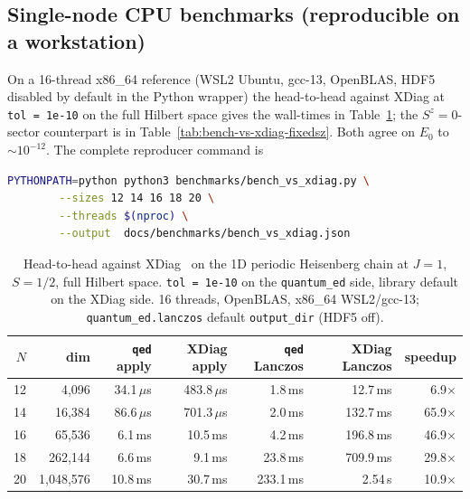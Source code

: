 \documentclass[submission, PhysCodeb]{SciPost}
\begin{document}
\subsection{Single-node CPU benchmarks (reproducible on a workstation)}
\label{sec:val-cpu}
On a 16-thread x86\_64 reference (WSL2 Ubuntu, gcc-13, OpenBLAS,
HDF5 disabled by default in the Python wrapper) the head-to-head
against XDiag at \texttt{tol = 1e-10} on the full Hilbert space gives
the wall-times in Table~\ref{tab:bench-vs-xdiag}; the
$S^z=0$-sector counterpart is in
Table~\ref{tab:bench-vs-xdiag-fixedsz}. Both agree on $E_0$ to
$\sim 10^{-12}$. The complete reproducer command is
\begin{lstlisting}[language=bash]
PYTHONPATH=python python3 benchmarks/bench_vs_xdiag.py \
        --sizes 12 14 16 18 20 \
        --threads $(nproc) \
        --output  docs/benchmarks/bench_vs_xdiag.json
\end{lstlisting}

\begin{table}[t]
\centering
\caption{Head-to-head against XDiag~\cite{Wietek2025XDiag} on the 1D
periodic Heisenberg chain at $J=1$, $S=1/2$, full Hilbert space.
\texttt{tol = 1e-10} on the \texttt{quantum\_ed} side, library
default on the XDiag side. 16 threads, OpenBLAS, x86\_64 WSL2/gcc-13;
\texttt{quantum\_ed.lanczos} default \texttt{output\_dir} (HDF5 off).}
\label{tab:bench-vs-xdiag}
\small
\begin{tabular}{rrrrrrr}
\toprule
$N$ & dim       & \texttt{qed} apply & XDiag apply &
\texttt{qed} Lanczos & XDiag Lanczos & speedup \\
\midrule
12  & 4{,}096   & 34.1\,$\mu$s & 483.8\,$\mu$s & 1.8\,ms  & 12.7\,ms  & 6.9$\times$  \\
14  & 16{,}384  & 86.6\,$\mu$s & 701.3\,$\mu$s & 2.0\,ms  & 132.7\,ms & 65.9$\times$ \\
16  & 65{,}536  & 6.1\,ms      & 10.5\,ms      & 4.2\,ms  & 196.8\,ms & 46.9$\times$ \\
18  & 262{,}144 & 6.6\,ms      & 9.1\,ms       & 23.8\,ms & 709.9\,ms & 29.8$\times$ \\
20  & 1{,}048{,}576 & 10.8\,ms & 30.7\,ms      & 233.1\,ms & 2.54\,s   & 10.9$\times$ \\
\bottomrule
\end{tabular}
\end{table}
\end{document}
